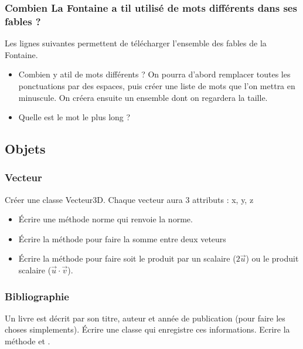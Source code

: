 \documentclass[letterpaper,10pt,english]{sphinxhowto}
\begin{document}
\subsubsection{Combien La Fontaine a t\sphinxhyphen{}il utilisé de mots différents dans ses fables ?}
\label{\detokenize{cours4_chaine_caractere_exercices:combien-la-fontaine-a-t-il-utilise-de-mots-differents-dans-ses-fables}}
\sphinxAtStartPar
Les lignes suivantes permettent de télécharger l’ensemble des fables de la Fontaine.
\begin{itemize}
\item {} 
\sphinxAtStartPar
Combien y a\sphinxhyphen{}t\sphinxhyphen{}il de mots différents ? On pourra d’abord remplacer toutes les ponctuations par des espaces, puis créer une liste de mots que l’on mettra en minuscule. On créera ensuite un ensemble dont on regardera la taille.

\item {} 
\sphinxAtStartPar
Quelle est le mot le plus long ?

\end{itemize}


\subsection{Objets}
\label{\detokenize{cours6_objet_exercices:objets}}\label{\detokenize{cours6_objet_exercices::doc}}

\subsubsection{Vecteur}
\label{\detokenize{cours6_objet_exercices:vecteur}}
\sphinxAtStartPar
Créer une classe Vecteur3D. Chaque vecteur aura 3 attributs : x, y, z
\begin{itemize}
\item {} 
\sphinxAtStartPar
Écrire une méthode norme qui renvoie la norme.

\item {} 
\sphinxAtStartPar
Écrire la méthode  pour faire la somme entre deux veteurs

\item {} 
\sphinxAtStartPar
Écrire la méthode  pour faire soit le produit par un scalaire (\(2\vec{u}\)) ou le produit scalaire (\(\vec{u}\cdot\vec{v}\)).

\end{itemize}


\subsubsection{Bibliographie}
\label{\detokenize{cours6_objet_exercices:bibliographie}}
\sphinxAtStartPar
Un livre est décrit par son titre, auteur et année de publication (pour faire les choses simplements). Écrire une classe  qui enregistre ces informations. Ecrire la méthode  et .
\end{document}
